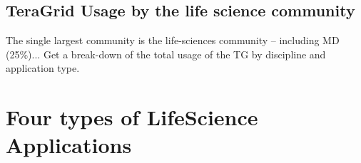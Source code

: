 \documentclass[12pt]{article}
\begin{document}
%
%
%
%
%
%
%

\subsection{TeraGrid Usage by the life science community}

The single largest community is the life-sciences community --
including MD (25\%)...
Get a break-down of the total usage of the TG by discipline and
application type.

\section{Four types of LifeScience Applications}
\end{document}
